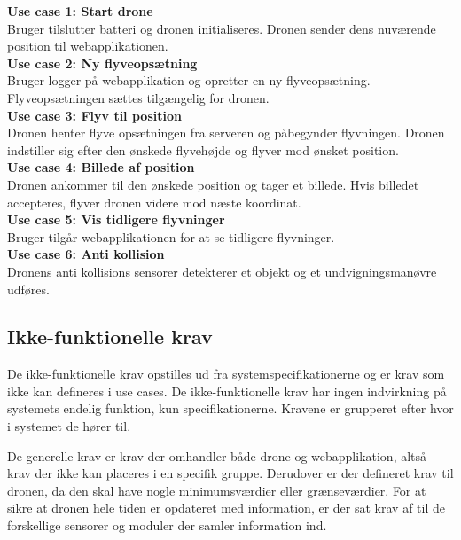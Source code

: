 \textbf{Use case 1: Start drone} \\
Bruger tilslutter batteri og dronen initialiseres. Dronen sender dens nuværende position til webapplikationen.\\

\textbf{Use case 2: Ny flyveopsætning} \\
Bruger logger på webapplikation og opretter en ny flyveopsætning. Flyveopsætningen sættes tilgængelig for dronen.\\

\textbf{Use case 3: Flyv til position}\\
Dronen henter flyve opsætningen fra serveren og påbegynder flyvningen. Dronen indstiller sig efter den ønskede flyvehøjde og flyver mod ønsket position. \\

\textbf{Use case 4: Billede af position} \\
Dronen ankommer til den ønskede position og tager et billede. Hvis billedet accepteres, flyver dronen videre mod næste koordinat. \\

\textbf{Use case 5: Vis tidligere flyvninger} \\
Bruger tilgår webapplikationen for at se tidligere flyvninger.\\

\textbf{Use case 6: Anti kollision} \\
Dronens anti kollisions sensorer detekterer et objekt og et undvigningsmanøvre udføres. \\

\newpage
\subsection{Ikke-funktionelle krav}


De ikke-funktionelle krav opstilles ud fra systemspecifikationerne og er krav som ikke kan defineres i use cases. De ikke-funktionelle krav har ingen indvirkning på systemets endelig funktion, kun specifikationerne.
Kravene er grupperet efter hvor i systemet de hører til. 

De generelle krav er krav der omhandler både drone og webapplikation, altså krav der ikke kan placeres i en specifik gruppe.
Derudover er der defineret krav til dronen, da den skal have nogle minimumsværdier eller grænseværdier.
For at sikre at dronen hele tiden er opdateret med information, er der sat krav af til de forskellige sensorer og moduler der samler information ind. 

